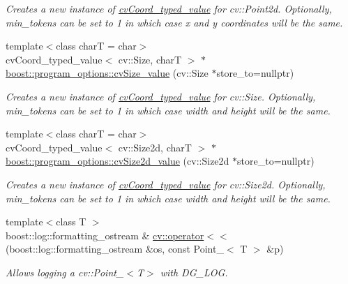 \begin{DoxyCompactItemize}
\begin{DoxyCompactList}\small\item\em Creates a new instance of \hyperlink{structboost_1_1program__options_1_1cv_coord__typed__value}{cv\+Coord\+\_\+typed\+\_\+value} for cv\+::\+Point2d. Optionally, min\+\_\+tokens can be set to 1 in which case x and y coordinates will be the same. \end{DoxyCompactList}\item 
{\footnotesize template$<$class charT  = char$>$ }\\cv\+Coord\+\_\+typed\+\_\+value$<$ cv\+::\+Size, charT $>$ $\ast$ \hyperlink{group___imagery_module_gae944e0209fb649650a1c5beac4d60fea}{boost\+::program\+\_\+options\+::cv\+Size\+\_\+value} (cv\+::\+Size $\ast$store\+\_\+to=nullptr)
\begin{DoxyCompactList}\small\item\em Creates a new instance of \hyperlink{structboost_1_1program__options_1_1cv_coord__typed__value}{cv\+Coord\+\_\+typed\+\_\+value} for cv\+::\+Size. Optionally, min\+\_\+tokens can be set to 1 in which case width and height will be the same. \end{DoxyCompactList}\item 
{\footnotesize template$<$class charT  = char$>$ }\\cv\+Coord\+\_\+typed\+\_\+value$<$ cv\+::\+Size2d, charT $>$ $\ast$ \hyperlink{group___imagery_module_gad6ef9cef6acd63e1f9d3adcb4e055cf1}{boost\+::program\+\_\+options\+::cv\+Size2d\+\_\+value} (cv\+::\+Size2d $\ast$store\+\_\+to=nullptr)
\begin{DoxyCompactList}\small\item\em Creates a new instance of \hyperlink{structboost_1_1program__options_1_1cv_coord__typed__value}{cv\+Coord\+\_\+typed\+\_\+value} for cv\+::\+Size2d. Optionally, min\+\_\+tokens can be set to 1 in which case width and height will be the same. \end{DoxyCompactList}\item 
{\footnotesize template$<$class T $>$ }\\boost\+::log\+::formatting\+\_\+ostream \& \hyperlink{group___imagery_module_ga4d7a2828ed1d678a96fa0ad0591c4103}{cv\+::operator$<$$<$} (boost\+::log\+::formatting\+\_\+ostream \&os, const Point\+\_\+$<$ T $>$ \&p)
\begin{DoxyCompactList}\small\item\em Allows logging a cv\+::\+Point\+\_\+$<$\+T$>$ with D\+G\+\_\+\+L\+OG. \end{DoxyCompactList}\item 

\end{DoxyCompactItemize}
